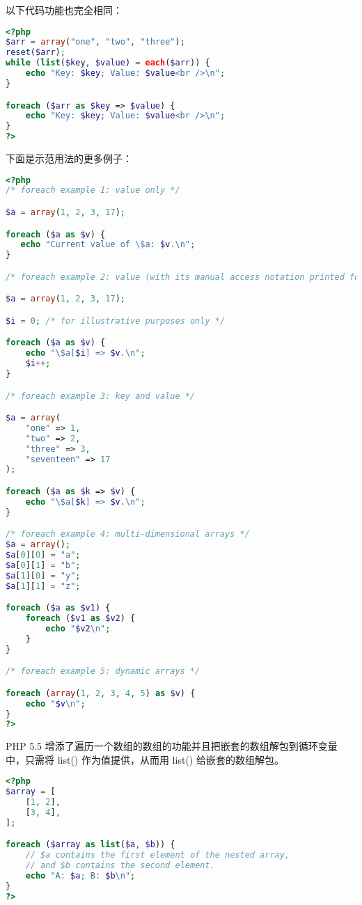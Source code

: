以下代码功能也完全相同：

\begin{lstlisting}[language=PHP]
<?php
$arr = array("one", "two", "three");
reset($arr);
while (list($key, $value) = each($arr)) {
    echo "Key: $key; Value: $value<br />\n";
}

foreach ($arr as $key => $value) {
    echo "Key: $key; Value: $value<br />\n";
}
?>
\end{lstlisting}


下面是示范用法的更多例子：

\begin{lstlisting}[language=PHP]
<?php
/* foreach example 1: value only */

$a = array(1, 2, 3, 17);

foreach ($a as $v) {
   echo "Current value of \$a: $v.\n";
}

/* foreach example 2: value (with its manual access notation printed for illustration) */

$a = array(1, 2, 3, 17);

$i = 0; /* for illustrative purposes only */

foreach ($a as $v) {
    echo "\$a[$i] => $v.\n";
    $i++;
}

/* foreach example 3: key and value */

$a = array(
    "one" => 1,
    "two" => 2,
    "three" => 3,
    "seventeen" => 17
);

foreach ($a as $k => $v) {
    echo "\$a[$k] => $v.\n";
}

/* foreach example 4: multi-dimensional arrays */
$a = array();
$a[0][0] = "a";
$a[0][1] = "b";
$a[1][0] = "y";
$a[1][1] = "z";

foreach ($a as $v1) {
    foreach ($v1 as $v2) {
        echo "$v2\n";
    }
}

/* foreach example 5: dynamic arrays */

foreach (array(1, 2, 3, 4, 5) as $v) {
    echo "$v\n";
}
?>
\end{lstlisting}



PHP 5.5 增添了遍历一个数组的数组的功能并且把嵌套的数组解包到循环变量中，只需将 list() 作为值提供，从而用 list() 给嵌套的数组解包。

\begin{lstlisting}[language=PHP]
<?php
$array = [
    [1, 2],
    [3, 4],
];

foreach ($array as list($a, $b)) {
    // $a contains the first element of the nested array,
    // and $b contains the second element.
    echo "A: $a; B: $b\n";
}
?>
\end{lstlisting}

